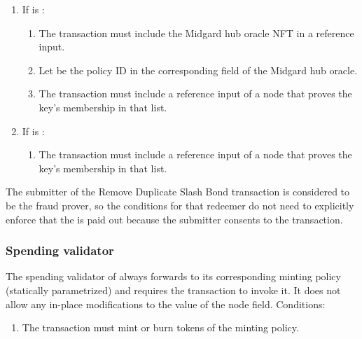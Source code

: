 \documentclass[../midgard.tex]{subfiles}
\begin{document}
\begin{description}
\begin{enumerate}
\begin{enumerate}
                \end{enumerate}
            \item If  is :
                \begin{enumerate}
                    \item The transaction must include the Midgard hub oracle NFT in a reference input.
                    \item Let  be the policy ID in the corresponding field of the Midgard hub oracle.
                    \item The transaction must include a reference input of a  node that proves the  key's membership in that list.
                \end{enumerate}
            \item If  is :
                \begin{enumerate}
                    \item The transaction must include a reference input of a  node that proves the  key's membership in that list.
                \end{enumerate}
        \end{enumerate}
    The submitter of the Remove Duplicate Slash Bond transaction is considered to be the fraud prover, so the conditions for that redeemer do not need to explicitly enforce that the  is paid out because the submitter consents to the transaction.
\end{description}

\subsubsection{Spending validator}
\label{h:registered-operators-spending-validator}

The spending validator of  always forwards to its corresponding minting policy (statically parametrized) and requires the transaction to invoke it.
It does not allow any in-place modifications to the  value of the node  field.
Conditions:
\begin{enumerate}
    \item The transaction must mint or burn tokens of the  minting policy.
\end{enumerate}
\end{document}
